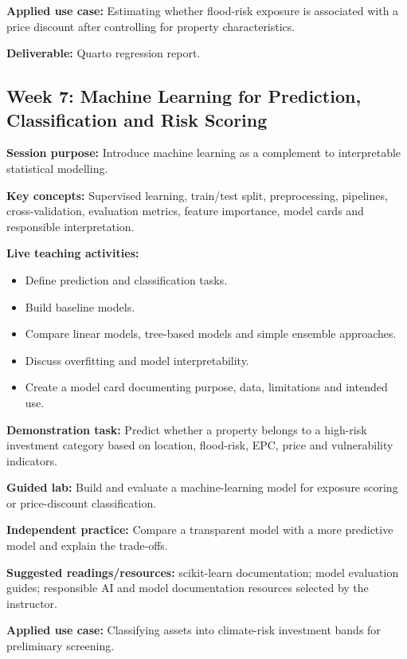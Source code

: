 \documentclass[
  a4paper,
]{article}
\providecommand{\tightlist}{%
  \setlength{\itemsep}{0pt}\setlength{\parskip}{0pt}}
\begin{document}
\textbf{Applied use case:} Estimating whether flood-risk exposure is
associated with a price discount after controlling for property
characteristics.

\textbf{Deliverable:} Quarto regression report.

\subsection{Week 7: Machine Learning for Prediction, Classification and
Risk
Scoring}\label{week-7-machine-learning-for-prediction-classification-and-risk-scoring}

\textbf{Session purpose:} Introduce machine learning as a complement to
interpretable statistical modelling.

\textbf{Key concepts:} Supervised learning, train/test split,
preprocessing, pipelines, cross-validation, evaluation metrics, feature
importance, model cards and responsible interpretation.

\textbf{Live teaching activities:}

\begin{itemize}
\tightlist
\item
  Define prediction and classification tasks.
\item
  Build baseline models.
\item
  Compare linear models, tree-based models and simple ensemble
  approaches.
\item
  Discuss overfitting and model interpretability.
\item
  Create a model card documenting purpose, data, limitations and
  intended use.
\end{itemize}

\textbf{Demonstration task:} Predict whether a property belongs to a
high-risk investment category based on location, flood-risk, EPC, price
and vulnerability indicators.

\textbf{Guided lab:} Build and evaluate a machine-learning model for
exposure scoring or price-discount classification.

\textbf{Independent practice:} Compare a transparent model with a more
predictive model and explain the trade-offs.

\textbf{Suggested readings/resources:} scikit-learn documentation; model
evaluation guides; responsible AI and model documentation resources
selected by the instructor.

\textbf{Applied use case:} Classifying assets into climate-risk
investment bands for preliminary screening.
\end{document}
